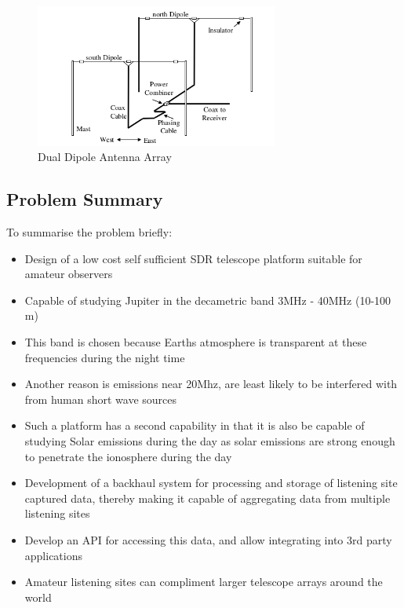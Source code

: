 \documentclass[runningheads,a4paper]{llncs}
\begin{document}
%
\begin{figure}[here]
\centering
\includegraphics[width=8cm]{images/08}
\caption{Dual Dipole Antenna Array \citep{nasa12}}
\label{fig:dual_dipole_antenna_array}
\end{figure}
%

\subsection*{Problem Summary}

To summarise the problem briefly:

\begin{itemize}
  \item Design of a low cost self sufficient SDR telescope platform suitable for amateur observers
  \item Capable of studying Jupiter in the decametric band 3MHz - 40MHz (10-100 m)
  \item This band is chosen because Earths atmosphere is transparent at these frequencies during the night time
  \item Another reason is emissions near 20Mhz, are least likely to be interfered with from human short wave sources
  \item Such a platform has a second capability in that it is also be capable of studying Solar emissions during the day as solar emissions are strong enough to penetrate the ionosphere during the day
  \item Development of a backhaul system for processing and storage of listening site captured data, thereby making it capable of aggregating data from multiple listening sites
  \item Develop an API for accessing this data, and allow integrating into 3rd party applications
  \item Amateur listening sites can compliment larger telescope arrays around the world
\end{itemize}


%
%
\newpage
\end{document}
